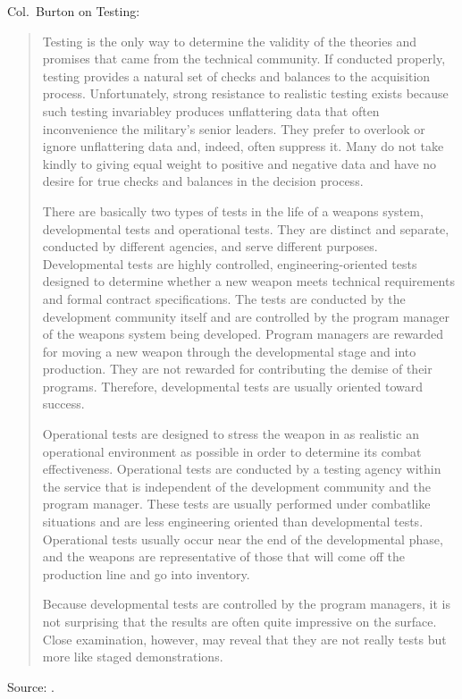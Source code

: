 \documentclass[a4paper]{article}
\begin{document}
Col.~Burton on Testing:
\begin{quotation}
	Testing is the only way to determine the validity of the
theories and promises that came from the technical community.
If conducted properly, testing provides a natural set of checks
and balances to the acquisition process.  Unfortunately, strong
resistance to realistic testing exists because such testing
invariabley produces unflattering data that often inconvenience
the military's senior leaders.  They prefer to overlook or
ignore unflattering data and, indeed, often suppress it.  Many
do not take kindly to giving equal weight to positive and negative
data and have no desire for true checks and balances in the
decision process.

There are basically two types of tests in the life of a weapons
system, developmental tests and operational tests.  They are
distinct and separate, conducted by different agencies, and
serve different purposes.  Developmental tests are highly
controlled, engineering-oriented tests designed to determine
whether a new weapon meets technical requirements and formal
contract specifications.  The tests are conducted by the
development community itself and are controlled by the program
manager of the weapons system being developed.  Program managers
are rewarded for moving a new weapon through the developmental
stage and into production.  They are not rewarded for contributing
the demise of their programs.  Therefore, developmental tests
are usually oriented toward success.

Operational tests are designed to stress the weapon in as
realistic an operational environment as possible in order to
determine its combat effectiveness.  Operational tests are
conducted by a testing agency within the service that is
independent of the development community and the program
manager.  These tests are usually performed under combatlike
situations and are less engineering oriented than developmental
tests.  Operational tests usually occur near the end of the
developmental phase, and the weapons are representative of those
that will come off the production line and go into inventory.

Because developmental tests are controlled by the program
managers, it is not surprising that the results are often quite
impressive on the surface.  Close examination, however, may
reveal that they are not really tests but more like staged
demonstrations.
\end{quotation}
Source: \citet[p.~112]{Burton1993}.
\medskip
\end{document}
